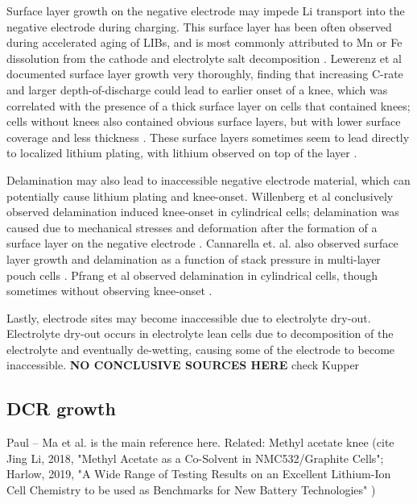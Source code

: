 \documentclass{article}
\begin{document}
Surface layer growth on the negative electrode may impede Li transport into the negative electrode during charging. This surface layer has been often observed during accelerated aging of LIBs, and is most commonly attributed to Mn or Fe dissolution from the cathode and electrolyte salt decomposition \cite{lewerenz_post-mortem_2017,lewerenz_systematic_2017,zhu_investigation_2021,stiaszny_electrochemical_2014,rahe_nanoscale_2019,keil_linear_2019,sarasketa-zabala_understanding_2015, willenberg_high-precision_2020}. Lewerenz et al documented surface layer growth very thoroughly, finding that increasing C-rate and larger depth-of-discharge could lead to earlier onset of a knee, which was correlated with the presence of a thick surface layer on cells that contained knees; cells without knees also contained obvious surface layers, but with lower surface coverage and less thickness \cite{lewerenz_post-mortem_2017,lewerenz_systematic_2017}. These surface layers sometimes seem to lead directly to localized lithium plating, with lithium observed on top of the layer \cite{zhu_investigation_2021}.

Delamination may also lead to inaccessible negative electrode material, which can potentially cause lithium plating and knee-onset. Willenberg et al conclusively observed delamination induced knee-onset in cylindrical cells; delamination was caused due to mechanical stresses and deformation after the formation of a surface layer on the negative electrode \cite{willenberg_high-precision_2020}. Cannarella et. al. also observed surface layer growth and delamination as a function of stack pressure in multi-layer pouch cells \cite{cannarella_stress_2014}. Pfrang et al observed delamination in cylindrical cells, though sometimes without observing knee-onset \cite{pfrang_long-term_2018}.

Lastly, electrode sites may become inaccessible due to electrolyte dry-out. Electrolyte dry-out occurs in electrolyte lean cells due to decomposition of the electrolyte and eventually de-wetting, causing some of the electrode to become inaccessible. \textbf{NO CONCLUSIVE SOURCES HERE} check Kupper \cite{kupper_end--life_2018}


\subsection{DCR growth}

Paul -- Ma et al.\cite{ma_editors_2019} is the main reference here. Related: Methyl acetate knee (cite Jing Li, 2018, "Methyl Acetate as a Co-Solvent in NMC532/Graphite Cells"; Harlow, 2019, "A Wide Range of Testing Results on an Excellent Lithium-Ion Cell Chemistry to be used as Benchmarks for New Battery Technologies" )
\end{document}
